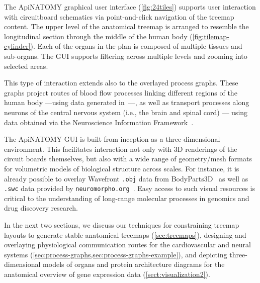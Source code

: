 The ApiNATOMY graphical user interface (\cref{fig:24tiles}) supports user interaction with
circuitboard schematics via point-and-click navigation of the treemap content. The upper level of
the anatomical treemap is arranged to resemble the longitudinal section through the middle of the
human body (\cref{fig:tilemap-cylinder}). Each of the organs in the plan is composed of multiple
tissues and sub-organs. The GUI supports filtering across multiple levels and zooming into selected
areas.

This type of interaction extends also to the overlayed process graphs. These graphs project routes
of blood flow processes linking different regions of the human body ---using data generated
in~\cite{deB11}---, as well as transport processes along neurons of the central nervous system
(i.e., the brain and spinal cord) --- using data obtained via the Neuroscience Information
Framework~\cite{Gar+08}.

The ApiNATOMY GUI is built from inception as a three-dimensional environment. This facilitates
interaction not only with 3D renderings of the circuit boards themselves, but also with a wide range
of geometry/mesh formats for volumetric models of biological structure across scales. For instance,
it is already possible to overlay Wavefront \texttt{.obj} data from BodyParts3D~\cite{MFT+09} as
well as \texttt{.swc} data provided by \texttt{neuromorpho.org}~\cite{Asc06}. Easy access to such
visual resources is critical to the understanding of long-range molecular processes in genomics and
drug discovery research.

In the next two sections, we discuss our techniques for
constraining treemap layouts to generate stable anatomical treemaps (\cref{sec:treemaps}),
designing and overlaying physiological communication routes for the cardiovascular and
	neural systems (\cref{sec:process-graphs,sec:process-graphs-example}), and
depicting three-dimensional models of organs and protein architecture diagrams for the anatomical
	overview of gene expression data (\cref{sect:visualization2}).




